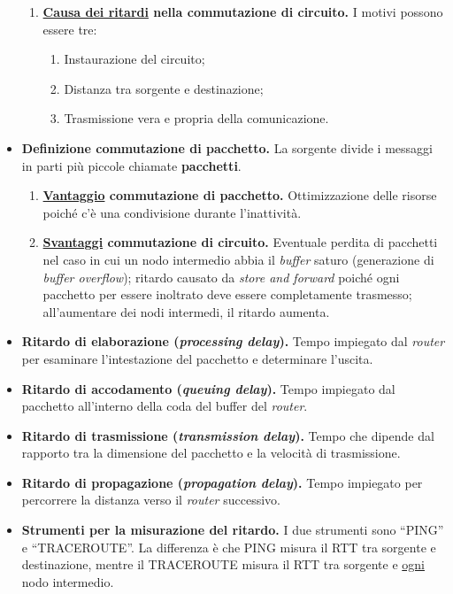 \documentclass[a4paper]{article}
\begin{document}
\begin{itemize}[label=]
\begin{enumerate}[label=\ding{43}]
			\item \textbf{\underline{Causa dei ritardi} nella commutazione di circuito.} I motivi possono essere tre:
			\begin{enumerate}[label=\Roman*]
				\item Instaurazione del circuito;
				\item Distanza tra sorgente e destinazione;
				\item Trasmissione vera e propria della comunicazione.
			\end{enumerate}
		\end{enumerate}
		
		\item \textbf{Definizione commutazione di pacchetto.} La sorgente divide i messaggi in parti più piccole chiamate \textbf{pacchetti}.
		
		\begin{enumerate}[label=\ding{43}]
			\item \textbf{\underline{Vantaggio} commutazione di pacchetto.} Ottimizzazione delle risorse poiché c'è una condivisione durante l'inattività.
			
			\item \textbf{\underline{Svantaggi} commutazione di circuito.} Eventuale perdita di pacchetti nel caso in cui un nodo intermedio abbia il \emph{buffer} saturo (generazione di \emph{buffer overflow}); ritardo causato da \emph{store and forward} poiché ogni pacchetto per essere inoltrato deve essere completamente trasmesso; all'aumentare dei nodi intermedi, il ritardo aumenta.
		\end{enumerate}
	
		\item \textbf{Ritardo di elaborazione (\emph{processing delay}).} Tempo impiegato dal \emph{router} per esaminare l'intestazione del pacchetto e determinare l'uscita.
		
		\item \textbf{Ritardo di accodamento (\emph{queuing delay}).} Tempo impiegato dal pacchetto all'interno della coda del buffer del \emph{router}.
		
		\item \textbf{Ritardo di trasmissione (\emph{transmission delay}).} Tempo che dipende dal rapporto tra la dimensione del pacchetto e la velocità di trasmissione.
		
		\item \textbf{Ritardo di propagazione (\emph{propagation delay}).} Tempo impiegato per percorrere la distanza verso il \emph{router} successivo.
		
		\item \textbf{Strumenti per la misurazione del ritardo.} I due strumenti sono ``PING'' e ``TRACEROUTE''. La differenza è che PING misura il RTT tra sorgente e destinazione, mentre il TRACEROUTE misura il RTT tra sorgente e \underline{ogni} nodo intermedio.
	\end{itemize}
\end{document}
